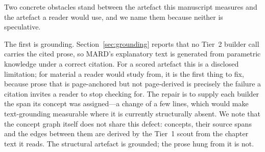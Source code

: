 \documentclass[conference]{IEEEtran}
\begin{document}
Two concrete obstacles stand between the artefact this manuscript measures and
the artefact a reader would use, and we name them because neither is
speculative.

The first is grounding. Section~\ref{sec:grounding} reports that no Tier~2
builder call carries the cited prose, so MARD's explanatory text is generated
from parametric knowledge under a correct citation. For a scored artefact this
is a disclosed limitation; for material a reader would study from, it is the
first thing to fix, because prose that is page-anchored but not
page-derived is precisely the failure a citation invites a reader to stop
checking for. The repair is to supply each builder the span its concept was
assigned---a change of a few lines, which would make text-grounding measurable
where it is currently structurally absent. We note that the concept graph
itself does not share this defect: concepts, their source spans and the edges
between them are derived by the Tier~1 scout from the chapter text it reads.
The structural artefact is grounded; the prose hung from it is not.
\end{document}
